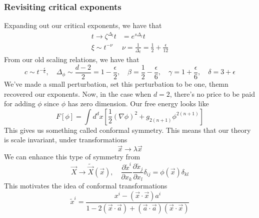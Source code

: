 \subsubsection{Revisiting critical exponents} 
Expanding out our critical exponents, 
we have that 
\begin{align*}
	t \to \zeta ^{ \Delta _ t  }  t & = e^{ s \Delta _ t } t  \\
	\xi \sim t ^{ - \nu } & \nu = \frac{1 }{ \Delta _ t } = \frac{1}{2 } 
	+ \frac{ \epsilon }{ 12 } 
\end{align*}
From our old scaling relations, we have that 
\[
 c \sim t ^{ - \frac{ \epsilon }{ 6}  }, \quad 
 \Delta _{ \phi } \sim \frac{ d - 2}{2 }  = 1 - \frac{ \epsilon   }{ 2 }, 
 \quad \beta = \frac{1}{2 } - \frac{ \epsilon }{ 6 }, \quad 
 \gamma =  1 + \frac{ \epsilon }{ 6 } , \quad
 \delta = 3 + \epsilon 
\] We've made a small perturbation, set this perturbation 
to be one, themn recovered our exponents. 
Now, in the case when $ d =  2 $, there's 
no price to be paid for adding $ \phi $ since 
$ \phi $ has zero dimension. 
Our free energy looks like 
\[
 F [ \phi ] = \int d ^ d x \left[  
 \frac{1}{2 } ( \nabla \phi ) ^ 2  + g_{ 2 ( n + 1 )} \phi ^{ 2 ( n + 1 ) }\right] 
\]
This gives us something called conformal symmetry. 
This means that our theory is scale invariant, 
under transformations 
\[
 \vec{x} \to \lambda \vec{x}
\] We can enhance this type of symmetry 
from 
\[
	\vec{X} \to \tilde{\vec{X} } ( \vec{x} )  , \quad 
	\frac{\partial \tilde{ x } ^ i  }{\partial  x_ k }
	\frac{\partial  \tilde{ x } _ j  }{\partial  x _ l } \delta _{ ij }
	= \phi ( \vec{x} ) \delta _{ kl }
\]  This motivates the idea of 
conformal transformations 
\[
	\tilde{ x } ^ i = \frac{x ^ i - ( \vec{x} \cdot  \vec{x} ) a ^ i }{
	1 - 2 ( \vec{x} \cdot  \vec{a} ) + ( \vec{a} \cdot  \vec{a} ) ( \vec{x} \cdot  \vec{x} )  } 
\] 

